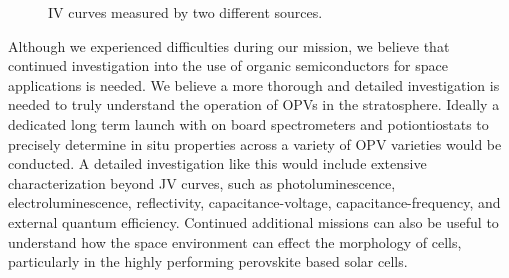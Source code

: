 \begin{figure}[h!]
\hfill
{}
\hfill
{}
\hfill
\caption{IV curves measured by two different sources.}
\label{fig:solar-cell-measurements}
\end{figure}

Although we experienced difficulties during our mission, we believe that continued investigation into the use of organic semiconductors for space applications is needed. We believe a more thorough and detailed investigation is needed to truly understand the operation of OPVs in the stratosphere. Ideally a dedicated long term launch with on board spectrometers and potiontiostats to precisely determine in situ properties across a variety of OPV varieties would be conducted. A detailed investigation like this would include extensive characterization beyond JV curves, such as photoluminescence, electroluminescence, reflectivity, capacitance-voltage, capacitance-frequency, and external quantum efficiency. Continued additional missions can also be useful to understand how the space environment can effect the morphology of cells, particularly in the highly performing perovskite based solar cells. 
